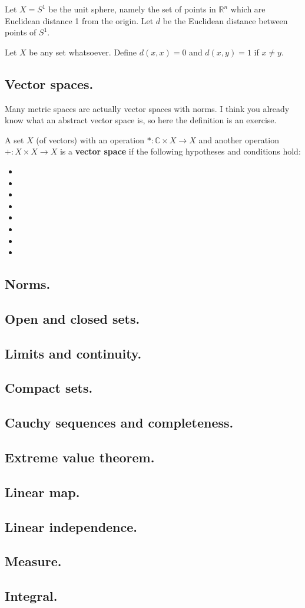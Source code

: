 \documentclass[12pt]{article}
\newcommand{\CC}{\mathbb{C}}
\newcommand{\RR}{\mathbb{R}}
\newcommand{\sect}[1]{\subsection*{#1.}}
\begin{document}
\begin{enumex}
\item Let $X=S^1$ be the unit sphere, namely the set of points in $\RR^n$ which are Euclidean distance 1 from the origin.  Let $d$ be the Euclidean distance between points of $S^1$.


\clearpage
\vspace*{20mm}

\item Let $X$ be any set whatsoever.  Define $d(x,x)=0$ and $d(x,y)=1$ if $x\ne y$.

\end{enumex}


\sect{Vector spaces}  Many metric spaces are actually vector spaces with norms.  I think you already know what an abstract vector space is, so here the definition is an exercise.


 A set $X$ (of vectors) with an operation $*:\CC\times X \to X$ and another operation $+:X\times X\to X$ is a \textbf{vector space} if the following hypotheses and conditions hold:
\begin{itemize}
\item \phantom{x} \vspace{5mm}

\item \phantom{x} \vspace{5mm}

\item \phantom{x} \vspace{5mm}

\item \phantom{x} \vspace{5mm}

\item \phantom{x} \vspace{5mm}

\item \phantom{x} \vspace{5mm}

\item \phantom{x} \vspace{5mm}

\item \phantom{x} \vspace{5mm}

\end{itemize}


\sect{Norms}  
\sect{Open and closed sets}

\sect{Limits and continuity}

\sect{Compact sets}

\sect{Cauchy sequences and completeness}

\sect{Extreme value theorem}

\sect{Linear map}

\sect{Linear independence}

\sect{Measure}

\sect{Integral}
\end{document}
